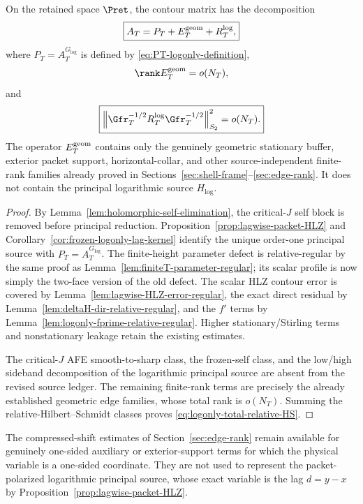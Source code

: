 \begin{proposition}
\label{prop:logonly-final-decomposition}
On the retained space $\Pret$, the contour matrix has the decomposition
\begin{equation}
\boxed{
A_T=P_T+E_T^{\rm geom}+R_T^{\log},
}
\label{eq:logonly-final-decomposition}
\end{equation}
where $P_T=A_T^{G_{\log}}$ is defined by
\eqref{eq:PT-logonly-definition},
\begin{equation}
\rank E_T^{\rm geom}=o(N_T),
\label{eq:logonly-edge-rank}
\end{equation}
and
\begin{equation}
\boxed{
\left\|\Gfr_T^{-1/2}R_T^{\log}\Gfr_T^{-1/2}\right\|_{S_2}^2=o(N_T).
}
\label{eq:logonly-total-relative-HS}
\end{equation}
The operator $E_T^{\rm geom}$ contains only the genuinely geometric stationary
buffer, exterior packet support, horizontal-collar, and other source-independent
finite-rank families already proved in Sections~\ref{sec:shell-frame}--\ref{sec:edge-rank}.
It does not contain the principal logarithmic source $H_{\log}$.
\end{proposition}

\begin{proof}
By Lemma~\ref{lem:holomorphic-self-elimination}, the critical-$J$ self block is
removed before principal reduction.  Proposition~\ref{prop:lagwise-packet-HLZ}
and Corollary~\ref{cor:frozen-logonly-lag-kernel} identify the unique order-one
principal source with $P_T=A_T^{G_{\log}}$.  The finite-height parameter defect
is relative-regular by the same proof as
Lemma~\ref{lem:finiteT-parameter-regular}; its scalar profile is now simply the
two-face version of the old defect.  The scalar HLZ contour error is covered by
Lemma~\ref{lem:lagwise-HLZ-error-regular}, the exact direct residual by
Lemma~\ref{lem:deltaH-dir-relative-regular}, and the $f'$ terms by
Lemma~\ref{lem:logonly-fprime-relative-regular}.  Higher stationary/Stirling
terms and nonstationary leakage retain the existing estimates.

The critical-$J$ AFE smooth-to-sharp class, the frozen-self class, and the
low/high sideband decomposition of the logarithmic principal source are absent
from the revised source ledger.  The remaining finite-rank terms are precisely
the already established geometric edge families, whose total rank is
$o(N_T)$.  Summing the relative-Hilbert--Schmidt classes proves
\eqref{eq:logonly-total-relative-HS}.
\end{proof}

\begin{remark}
The compressed-shift estimates of Section~\ref{sec:edge-rank} remain available
for genuinely one-sided auxiliary or exterior-support terms for which the
physical variable is a one-sided coordinate.  They are not used to represent
the packet-polarized logarithmic principal source, whose exact variable is the
lag $d=y-x$ by Proposition~\ref{prop:lagwise-packet-HLZ}.
\end{remark}